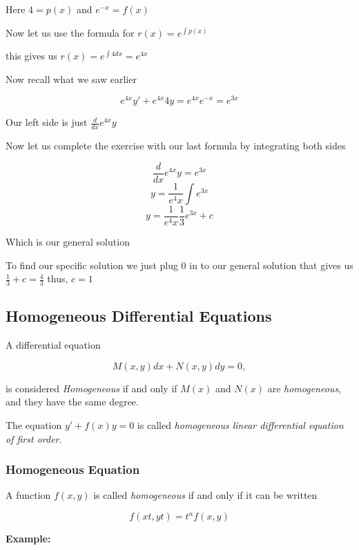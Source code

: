 Here \(4 = p(x)\) and \(e^{-x} = f(x)\)
\vspace{\baselineskip}

Now let us use the formula for \(r(x) = e^{\int p (x)}\)
\vspace{\baselineskip}

this gives us \(r(x) = e^{\int 4dx} = e^{4x}\)
\vspace{\baselineskip}

Now recall what we saw earlier

\[e^{4x}y' + e^{4x}4y = e^{4x}e^{-x} = e^{3x}\]

Our left side is just \(\frac{d}{dx} e^{4x}y\)
\vspace{\baselineskip}

Now let us complete the exercise with our last formula by integrating both sides

\[\frac{d}{dx} e^{4x}y = e^{3x}\]
\[y = \frac{1}{e^4x}\int e^{3x}\]
\[y = \frac{1}{e^4x} \frac{1}{3}e^{3x} + c\]

Which is our general solution
\vspace{\baselineskip}

To find our specific solution we just plug 0 in to our general solution that gives us
\(\frac{1}{3} + c = \frac{4}{3}\) thus, \(c = 1\)

\subsection{Homogeneous Differential Equations}

A differential equation 

\[M(x,y)dx + N(x,y)dy = 0,\]

is considered \emph{Homogeneous} if and only if
\(M(x)\) and \(N(x)\) are \emph{homogeneous}, and they have the same degree.
\vspace{\baselineskip}

The equation \(y' + f(x)y = 0\) is called \emph{homogeneous linear differential equation of first order}.

\subsubsection{Homogeneous Equation}

A function \(f(x,y)\) is called \emph{homogeneous} if and only if it can be written

\[f(xt, yt) = t^n f(x,y)\]

\textbf{Example: }

